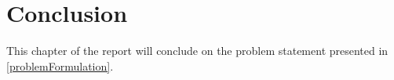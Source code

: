 \chapter{Conclusion}

This chapter of the report will conclude on the problem statement presented in \cref{problemFormulation}.
